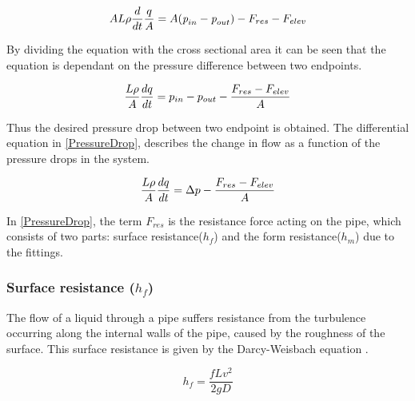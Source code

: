 \begin{equation}
    A L \rho \frac{d}{dt} \frac{q}{A} = A (\textit{p}_{in} -  \textit{p}_{out}) - F_{res} - F_{elev}\\
\end{equation}

By dividing the equation with the cross sectional area it can be seen that the equation is dependant on the pressure difference between two endpoints.

\begin{equation}
    \frac{L \rho}{A} \frac{dq}{dt} =p_{in} - p_{out} - \frac{ F_{res} - F_{elev}}{A} \\
\end{equation}

Thus the desired pressure drop between two endpoint is obtained. The differential equation in \eqref{PressureDrop}, describes the change in flow as a function of the pressure drops in the system.

\begin{equation}
    \frac{L \rho}{A} \frac{dq}{dt} =\Delta p - \frac{ F_{res} - F_{elev}}{A} \\
    \label{PressureDrop}
\end{equation}

In \eqref{PressureDrop}, the term $F_{res}$ is the resistance force acting on the 
pipe, which consists of two parts: surface resistance($h_{f}$) and the form resistance($h_{m}$) due to the fittings. %

\subsubsection{Surface resistance (\texorpdfstring{$h_f$}{})} 
The flow of a liquid through a pipe suffers resistance from 
the turbulence occurring along the internal walls of the pipe, caused by the roughness of the surface. This surface resistance is given by the Darcy-Weisbach equation \cite{Design_Water}.

\begin{equation}
  h_f = \frac{fLv^2}{2gD}
  \label{Darcy}
\end{equation}

